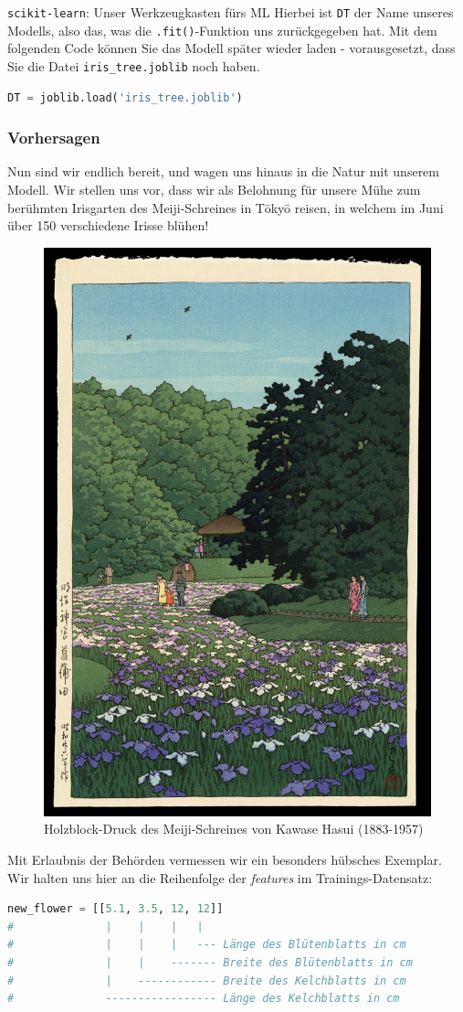 \begin{lpu}{\texttt{scikit-learn}: Unser Werkzeugkasten fürs ML}
Hierbei ist \texttt{DT} der Name unseres Modells, also das, was die \texttt{.fit()}-Funktion uns zurückgegeben hat. Mit dem folgenden Code können Sie das Modell später wieder laden - vorausgesetzt, dass Sie die Datei \texttt{iris\_tree.joblib} noch haben.

\begin{lstlisting}[language=Python]
DT = joblib.load('iris_tree.joblib')
\end{lstlisting}

\subsubsection*{Vorhersagen}
Nun sind wir endlich bereit, und wagen uns hinaus in die Natur mit unserem Modell. Wir stellen uns vor, dass wir als Belohnung für unsere Mühe zum berühmten Irisgarten des Meiji-Schreines in Tōkyō reisen, in welchem im Juni über 150 verschiedene Irisse blühen! 

\begin{figure}
\begin{center}
  \includegraphics[width=0.5\linewidth]{irisgarden.jpg}
  \caption{Holzblock-Druck des Meiji-Schreines von Kawase Hasui (1883-1957)}
\end{center}
\end{figure}

Mit Erlaubnis der Behörden vermessen wir ein besonders hübsches Exemplar. Wir halten uns hier an die Reihenfolge der \textit{features} im Trainings-Datensatz:

\begin{lstlisting}[language=Python]
new_flower = [[5.1, 3.5, 12, 12]]
#              |    |    |   |
#              |    |    |   --- Länge des Blütenblatts in cm
#              |    |    ------- Breite des Blütenblatts in cm
#              |    ------------ Breite des Kelchblatts in cm
#              ----------------- Länge des Kelchblatts in cm
\end{lstlisting}


\end{lpu}
